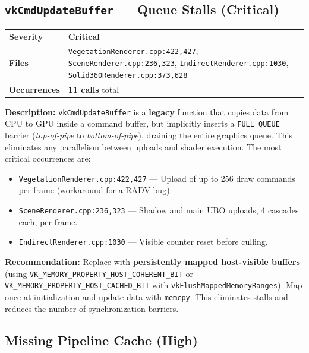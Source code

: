 \documentclass[a4paper,10pt]{article}
\newcommand{\severity}[1]{%
  \ifstrequal{#1}{Critical}{\textcolor{high}{\textbf{#1}}}{%
  \ifstrequal{#1}{High}{\textcolor{high}{\textbf{#1}}}{%
  \ifstrequal{#1}{Medium}{\textcolor{medium}{\textbf{#1}}}{%
  \ifstrequal{#1}{Low}{\textcolor{low}{\textbf{#1}}}{#1}}}}}
\begin{document}
\subsection{\texttt{vkCmdUpdateBuffer} --- Queue Stalls (Critical)}

\begin{tabular}{ll}
    \textbf{Severity} & \severity{Critical} \\
    \textbf{Files}     & \texttt{VegetationRenderer.cpp:422,427},
                          \texttt{SceneRenderer.cpp:236,323},
                          \texttt{IndirectRenderer.cpp:1030},
                          \texttt{Solid360Renderer.cpp:373,628} \\
    \textbf{Occurrences}& \textbf{11 calls} total \\
\end{tabular}

\vspace{0.5em}
\noindent
\textbf{Description:} \texttt{vkCmdUpdateBuffer} is a \textbf{legacy} function that
copies data from CPU to GPU inside a command buffer, but implicitly inserts a
\texttt{FULL\_QUEUE} barrier (\textit{top-of-pipe} to \textit{bottom-of-pipe}),
draining the entire graphics queue. This eliminates any parallelism between uploads
and shader execution. The most critical occurrences are:

\begin{itemize}[nosep]
    \item \texttt{VegetationRenderer.cpp:422,427} --- Upload of up to 256 draw
          commands per frame (workaround for a RADV bug).
    \item \texttt{SceneRenderer.cpp:236,323} --- Shadow and main UBO uploads,
          4 cascades each, per frame.
    \item \texttt{IndirectRenderer.cpp:1030} --- Visible counter reset before culling.
\end{itemize}

\noindent\textbf{Recommendation:} Replace with \textbf{persistently mapped host-visible
buffers} (using \texttt{VK\_MEMORY\_PROPERTY\_HOST\_COHERENT\_BIT}
or \texttt{VK\_MEMORY\_PROPERTY\_HOST\_CACHED\_BIT} with
\texttt{vkFlushMappedMemoryRanges}). Map once at initialization and update
data with \texttt{memcpy}. This eliminates stalls and reduces the number of
synchronization barriers.

\subsection{Missing Pipeline Cache (High)}
\end{document}
